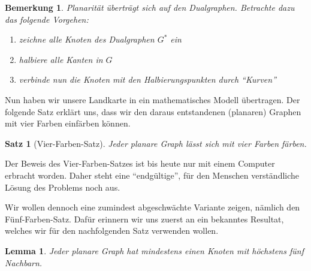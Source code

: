 \documentclass[ngerman, a4paper, 12pt]{article}
\newcounter{themcount}
\theoremstyle{plain}
\newtheorem{bemerkung}[themcount]{Bemerkung}
\newtheorem{satz}[themcount]{Satz}
\newtheorem{lemma}[themcount]{Lemma}
\theoremstyle{break}
\theoremstyle{proofstyle}
\begin{document}
	\begin{bemerkung}
		Planarität überträgt sich auf den Dualgraphen. Betrachte dazu das folgende Vorgehen:
		\begin{enumerate}[nolistsep, topsep=-\parskip]
			\item zeichne alle Knoten des Dualgraphen $G^\ast$ ein
			\item halbiere alle Kanten in $G$
			\item verbinde nun die Knoten mit den Halbierungspunkten durch \enquote{Kurven}
		\end{enumerate}
	\end{bemerkung}

	Nun haben wir unsere Landkarte in ein mathematisches Modell übertragen.  Der folgende Satz erklärt uns, dass wir den daraus entstandenen (planaren) Graphen mit vier Farben einfärben können.

	\begin{satz}[Vier-Farben-Satz]
		Jeder planare Graph lässt sich mit vier Farben färben.
	\end{satz}

	Der Beweis des Vier-Farben-Satzes ist bis heute nur mit einem Computer erbracht worden. Daher steht eine \enquote{endgültige}, für den Menschen verständliche Lösung des Problems noch aus.
	
	Wir wollen dennoch eine zumindest abgeschwächte Variante zeigen, nämlich den Fünf-Farben-Satz. Dafür erinnern wir uns zuerst an ein bekanntes Resultat, welches wir für den nachfolgenden Satz verwenden wollen.
	
	\begin{lemma}
		\label{lemma: planar5Knoten}
		Jeder planare Graph hat mindestens einen Knoten mit höchstens fünf Nachbarn.
	\end{lemma}
\end{document}

